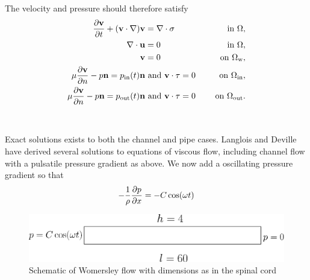 \\
\\
The velocity and pressure should therefore satisfy
\begin{alignat}{4}
\frac{\partial \mathbf{v}}{\partial t} + (\mathbf{v} \cdot \nabla ) \mathbf{v} & = \nabla \cdot \sigma \quad & \text{ in } \Omega, \\
\nabla \cdot \mathbf{u} & = 0 \quad & \text{ in } \Omega, \\
\mathbf{v} & =0 \quad & \text{ on } \Omega_{\text{w}}, \\
\mu \frac{\partial \mathbf{v}}{\partial n} - p\mathbf{n} = p_{\text{in}}(t)\mathbf{n} & \text{ and } \mathbf{v}\cdot \tau  = 0 \quad & \text{ on } \Omega_{\text{in}}, \\
\mu \frac{\partial \mathbf{v}}{\partial n} - p\mathbf{n} = p_{\text{out}}(t)\mathbf{n} & \text{ and } \mathbf{v}\cdot \tau = 0 \quad &  \text{ on } \Omega_{\text{out}}. \label{Womersley}
\end{alignat}
\\
\\
Exact solutions exists to both the channel and pipe cases. Langlois and Deville \cite{Lang64} have derived several solutions to equations of viscous flow, including channel flow with a pulsatile pressure gradient as above. We now add a oscillating pressure gradient so that
\begin{align}
-\frac{1}{\rho}\frac{\partial p}{\partial x} = -C\cos(\omega t)
\end{align}
\begin{center}
\begin{figure}[!ht]
\includegraphics[width=\linewidth]{figures/Womersley}
\caption{Schematic of Womersley flow with dimensions as in the spinal cord} \label{fig:Wom}
\end{figure}
\end{center}

